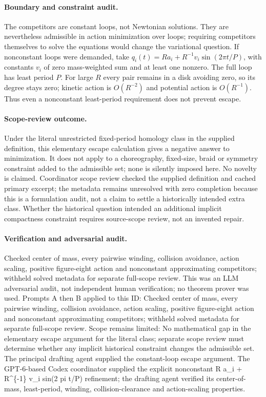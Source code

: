 \documentclass[11pt]{article}
\begin{document}
\paragraph{Boundary and constraint audit.}The competitors are constant loops, not Newtonian solutions. They are nevertheless admissible in action minimization over loops; requiring competitors themselves to solve the equations would change the variational question. If nonconstant loops were demanded, take \(q_i(t)=Ra_i+R^{-1}v_i\sin(2\pi t/P)\), with constants \(v_i\) of zero mass-weighted sum and at least one nonzero. The full loop has least period \(P\). For large \(R\) every pair remains in a disk avoiding zero, so its degree stays zero; kinetic action is \(O(R^{-2})\) and potential action is \(O(R^{-1})\). Thus even a nonconstant least-period requirement does not prevent escape.
\paragraph{Scope-review outcome.}Under the literal unrestricted fixed-period homology class in the supplied definition, this elementary escape calculation gives a negative answer to minimization. It does not apply to a choreography, fixed-size, braid or symmetry constraint added to the admissible set; none is silently imposed here. No novelty is claimed. Coordinator scope review checked the supplied definition and cached primary excerpt; the metadata remains unresolved with zero completion because this is a formulation audit, not a claim to settle a historically intended extra class. Whether the historical question intended an additional implicit compactness constraint requires source-scope review, not an invented repair.

\paragraph{Verification and adversarial audit.}
Checked center of mass, every pairwise winding, collision avoidance, action scaling, positive figure-eight action and nonconstant approximating competitors; withheld solved metadata for separate full-scope review. This was an LLM adversarial audit, not independent human verification; no theorem prover was used. Prompts A then B applied to this ID: Checked center of mass, every pairwise winding, collision avoidance, action scaling, positive figure-eight action and nonconstant approximating competitors; withheld solved metadata for separate full-scope review. Scope remains limited: No mathematical gap in the elementary escape argument for the literal class; separate scope review must determine whether any implicit historical constraint changes the admissible set. The principal drafting agent supplied the constant-loop escape argument. The GPT-6-based Codex coordinator supplied the explicit nonconstant R a\_i + R\textasciicircum{}\{-1\} v\_i sin(2 pi t/P) refinement; the drafting agent verified its center-of-mass, least-period, winding, collision-clearance and action-scaling properties.
\end{document}
